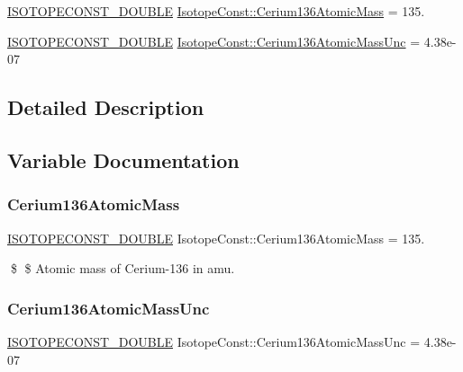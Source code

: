 \begin{DoxyCompactItemize}
\item 
\mbox{\hyperlink{group___isotope_const-_macros_ga8f45a7272ce02c0b4c65c44636ed719a}{I\+S\+O\+T\+O\+P\+E\+C\+O\+N\+S\+T\+\_\+\+D\+O\+U\+B\+LE}} \mbox{\hyperlink{group___isotope_const-_cerium-_ce136_gac05a06cf88898d457c94c781f98b14cf}{Isotope\+Const\+::\+Cerium136\+Atomic\+Mass}} = 135.
\item 
\mbox{\hyperlink{group___isotope_const-_macros_ga8f45a7272ce02c0b4c65c44636ed719a}{I\+S\+O\+T\+O\+P\+E\+C\+O\+N\+S\+T\+\_\+\+D\+O\+U\+B\+LE}} \mbox{\hyperlink{group___isotope_const-_cerium-_ce136_gafe6fd2566401058361edc2ba5235c6c1}{Isotope\+Const\+::\+Cerium136\+Atomic\+Mass\+Unc}} = 4.\+38e-\/07
\end{DoxyCompactItemize}


\subsection{Detailed Description}


\subsection{Variable Documentation}
\mbox{\label{group___isotope_const-_cerium-_ce136_gac05a06cf88898d457c94c781f98b14cf}} 
\subsubsection{\texorpdfstring{Cerium136\+Atomic\+Mass}{Cerium136AtomicMass}}
{\footnotesize\ttfamily \mbox{\hyperlink{group___isotope_const-_macros_ga8f45a7272ce02c0b4c65c44636ed719a}{I\+S\+O\+T\+O\+P\+E\+C\+O\+N\+S\+T\+\_\+\+D\+O\+U\+B\+LE}} Isotope\+Const\+::\+Cerium136\+Atomic\+Mass = 135.}

\$ \$ Atomic mass of Cerium-\/136 in amu. \mbox{\label{group___isotope_const-_cerium-_ce136_gafe6fd2566401058361edc2ba5235c6c1}} 
\subsubsection{\texorpdfstring{Cerium136\+Atomic\+Mass\+Unc}{Cerium136AtomicMassUnc}}
{\footnotesize\ttfamily \mbox{\hyperlink{group___isotope_const-_macros_ga8f45a7272ce02c0b4c65c44636ed719a}{I\+S\+O\+T\+O\+P\+E\+C\+O\+N\+S\+T\+\_\+\+D\+O\+U\+B\+LE}} Isotope\+Const\+::\+Cerium136\+Atomic\+Mass\+Unc = 4.\+38e-\/07}

